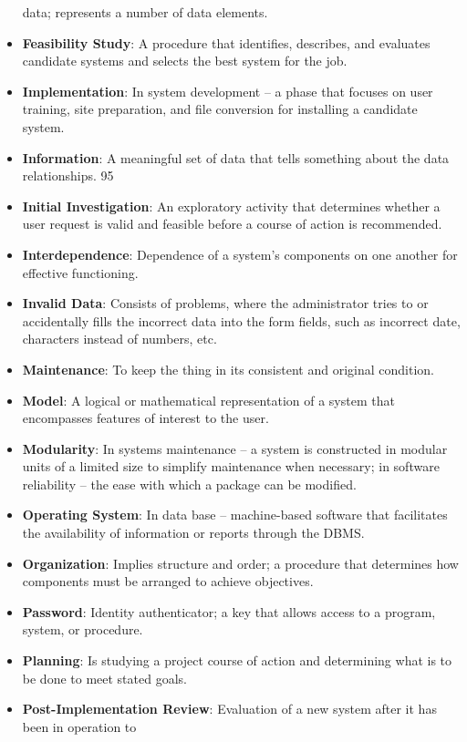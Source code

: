 \begin{itemize}
	data; represents a number of data elements.
	\item \textbf{Feasibility Study}:  A procedure that identifies, describes, and evaluates candidate systems and
	selects the best system for the job.
	\item \textbf{Implementation}:  In system development – a phase that focuses on user training, site preparation,
	and file conversion for installing a candidate system.
	\item \textbf{Information}:  A meaningful set of data that tells something about the data relationships. 
	95
	\item \textbf{Initial Investigation}:  An exploratory activity that determines whether a user request is valid and
	feasible before a course of action is recommended.
	\item \textbf{Interdependence}:  Dependence of a system’s components on one another for effective functioning.
	\item \textbf{Invalid Data}:  Consists of problems, where the administrator tries to or accidentally fills the
	incorrect data into the form fields, such as incorrect date, characters instead of numbers, etc.
	\item \textbf{Maintenance}:  To keep the thing in its consistent and original condition.
	\item \textbf{Model}:  A logical or mathematical representation of a system that encompasses features of interest
	to the user.
	\item \textbf{Modularity}:  In systems maintenance – a system is constructed in modular units of a limited size to
	simplify maintenance when necessary; in software reliability – the ease with which a package can be
	modified.
	\item \textbf{Operating System}:  In data base – machine-based software that facilitates the availability of
	information or reports through the DBMS.
	\item \textbf{Organization}:  Implies structure and order; a procedure that determines how components must be
	arranged to achieve objectives.
	\item \textbf{Password}:  Identity authenticator; a key that allows access to a program, system, or procedure.
	\item \textbf{Planning}:  Is studying a project course of action and determining what is to be done to meet stated
	goals.
	\item \textbf{Post-Implementation Review}:  Evaluation of a new system after it has been in operation to

\end{itemize}
